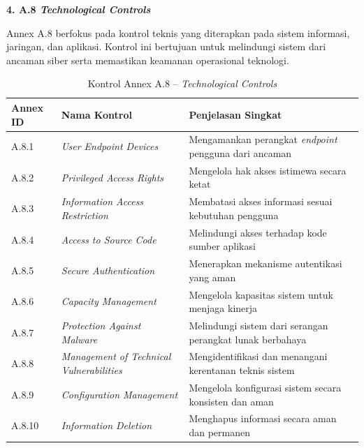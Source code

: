 \vspace{4pt}
\noindent\textbf{4. A.8 \textit{Technological Controls}}

Annex A.8 berfokus pada kontrol teknis yang diterapkan pada sistem informasi, jaringan, dan aplikasi. Kontrol ini bertujuan untuk melindungi sistem dari ancaman siber serta memastikan keamanan operasional teknologi.

\begin{table}[H]
\centering
\small
\caption{Kontrol Annex A.8 -- \textit{Technological Controls} \cite{isoiec20227001}}
\label{tab:annex_a8}
\begin{tabular}{|P{1.6cm}|P{5.0cm}|P{6.4cm}|}
\hline
\textbf{Annex ID} & \textbf{Nama Kontrol} & \textbf{Penjelasan Singkat} \\
\hline
A.8.1  & \textit{User Endpoint Devices}                                        & Mengamankan perangkat \textit{endpoint} pengguna dari ancaman \\
\hline
A.8.2  & \textit{Privileged Access Rights}                                     & Mengelola hak akses istimewa secara ketat \\
\hline
A.8.3  & \textit{Information Access Restriction}                               & Membatasi akses informasi sesuai kebutuhan pengguna \\
\hline
A.8.4  & \textit{Access to Source Code}                                        & Melindungi akses terhadap kode sumber aplikasi \\
\hline
A.8.5  & \textit{Secure Authentication}                                        & Menerapkan mekanisme autentikasi yang aman \\
\hline
A.8.6  & \textit{Capacity Management}                                          & Mengelola kapasitas sistem untuk menjaga kinerja \\
\hline
A.8.7  & \textit{Protection Against Malware}                                   & Melindungi sistem dari serangan perangkat lunak berbahaya \\
\hline
A.8.8  & \textit{Management of Technical Vulnerabilities}                      & Mengidentifikasi dan menangani kerentanan teknis sistem \\
\hline
A.8.9  & \textit{Configuration Management}                                     & Mengelola konfigurasi sistem secara konsisten dan aman \\
\hline
A.8.10 & \textit{Information Deletion}                                         & Menghapus informasi secara aman dan permanen \\

\end{tabular}
\end{table}
